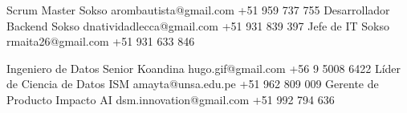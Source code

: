 %
%
%

\vspace{1em}
\begin{referees}
		 	{}
		 	{Scrum Master}
		 	{Sokso}
		 	{arombautista@gmail.com}
		 	{+51 959 737 755}
		 	{}
		 	{Desarrollador Backend}
		 	{Sokso}
		 	{dnatividadlecca@gmail.com}
		 	{+51 931 839 397}
		 	{}
		 	{Jefe de IT}
		 	{Sokso}
		 	{rmaita26@gmail.com}
		 	{+51 931 633 846}
\par\bigskip
		 	{}
		 	{Ingeniero de Datos Senior}
		 	{Koandina}
		 	{hugo.gif@gmail.com}
		 	{+56 9 5008 6422}
		 	{}
		 	{Líder de Ciencia de Datos}
		 	{ISM}
		 	{amayta@unsa.edu.pe}
		 	{+51 962 809 009}
		 	{}
		 	{Gerente de Producto}
		 	{Impacto AI}
		 	{dsm.innovation@gmail.com}
		 	{+51 992 794 636}
\end{referees}